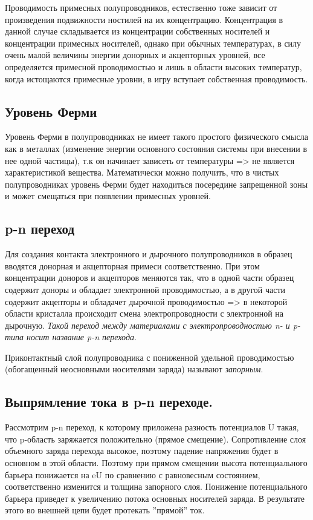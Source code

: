 \documentclass[a4paper, 12pt]{article}
\begin{document}
Проводимость примесных полупроводников, естественно тоже зависит от произведения подвижности ностилей на их концентрацию. Концентрация в данной случае складывается из концентрации собственных носителей и концентрации примесных носителей, однако при обычных температурах, в силу очень малой величины энергии донорных и акцепторных уровней, все определяется примесной проводимостью и лишь в области высоких температур, когда истощаются примесные уровни, в игру вступает собственная проводимость.

\subsection*{Уровень Ферми}
Уровень Ферми в полупроводниках не имеет такого простого физического смысла как в металлах (изменение энергии основного состояния системы при внесении в нее одной частицы), т.к он начинает зависеть от температуры => не является характеристикой вещества. Математически можно получить, что в чистых полупроводниках уровень Ферми будет находиться посередине запрещенной зоны и может смещаться при появлении примесных уровней.

\subsection*{p-n переход}

Для создания контакта электронного и дырочного полупроводников в образец вводятся донорная и акцепторная примеси соответственно. При этом концентрации доноров и акцепторов меняются так, что в одной части образец содержит доноры и обладает электронной проводимостью, а в другой части содержит акцепторы и обладачет дырочной проводимостью => в некоторой области кристалла происходит смена электропроводности с электронной на дырочную. \textit{Такой переход между материалами с электропроводностью n- и p- типа носит название p-n перехода}.

Приконтактный слой полупроводника с пониженной удельной проводимостью (обогащенный неосновными носителями заряда) называют \textit{запорным}.

\subsection*{Выпрямление тока в p-n переходе.}

Рассмотрим p-n переход, к которому приложена разность потенциалов U такая, что p-область заряжается положительно (прямое смещение). Сопротивление слоя объемного заряда перехода высокое, поэтому падение напряжения будет в основном в этой области. Поэтому при прямом смещении высота потенциального барьера понижается на eU по сравнению с равновесным состоянием, соответственно изменится и толщина запорного слоя. Понижение потенциального барьера приведет к увеличению потока основных носителей заряда. В результате этого во внешней цепи будет протекать ”прямой” ток.
\end{document}
